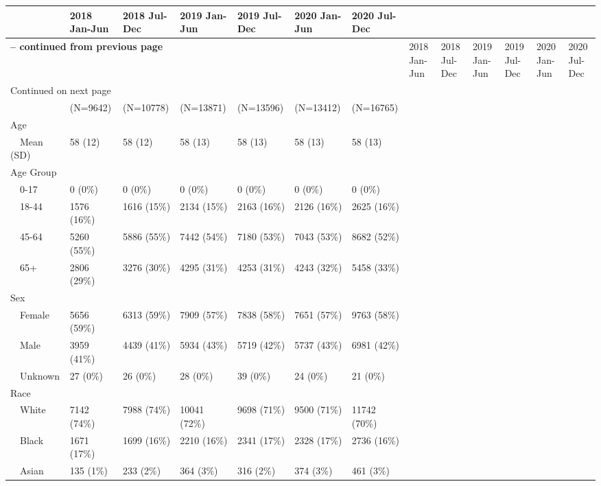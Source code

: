 \begin{longtable}{p{}p{}p{}p{}p{}p{}p{}}
   & 2018 Jan-Jun & 2018 Jul-Dec & 2019 Jan-Jun & 2019 Jul-Dec & 2020 Jan-Jun & 2020 Jul-Dec \\ 
  \hline 
\endfirsthead 
\multicolumn{7}{p{\textwidth}}{{ \bfseries \tablename \thetable{} -- continued from previous page}} \ 
\hline Feature & 2018 Jan-Jun & 2018 Jul-Dec & 2019 Jan-Jun & 2019 Jul-Dec & 2020 Jan-Jun & 2020 Jul-Dec \\ \hline 
\endhead 
\hline \multicolumn{7}{p{\textwidth}}{{Continued on next page}} \\ \hline 
\endfoot 
\hline 
\endlastfoot 
 \hline
 & (N=9642) & (N=10778) & (N=13871) & (N=13596) & (N=13412) & (N=16765) \\ 
  Age &  &  &  &  &  &  \\ 
    Mean (SD) & 58 (12) & 58 (12) & 58 (13) & 58 (13) & 58 (13) & 58 (13) \\ 
  Age Group &  &  &  &  &  &  \\ 
    0-17 & 0 (0\%) & 0 (0\%) & 0 (0\%) & 0 (0\%) & 0 (0\%) & 0 (0\%) \\ 
    18-44 & 1576 (16\%) & 1616 (15\%) & 2134 (15\%) & 2163 (16\%) & 2126 (16\%) & 2625 (16\%) \\ 
    45-64 & 5260 (55\%) & 5886 (55\%) & 7442 (54\%) & 7180 (53\%) & 7043 (53\%) & 8682 (52\%) \\ 
    65+ & 2806 (29\%) & 3276 (30\%) & 4295 (31\%) & 4253 (31\%) & 4243 (32\%) & 5458 (33\%) \\ 
  Sex &  &  &  &  &  &  \\ 
    Female & 5656 (59\%) & 6313 (59\%) & 7909 (57\%) & 7838 (58\%) & 7651 (57\%) & 9763 (58\%) \\ 
    Male & 3959 (41\%) & 4439 (41\%) & 5934 (43\%) & 5719 (42\%) & 5737 (43\%) & 6981 (42\%) \\ 
    Unknown & 27 (0\%) & 26 (0\%) & 28 (0\%) & 39 (0\%) & 24 (0\%) & 21 (0\%) \\ 
  Race &  &  &  &  &  &  \\ 
    White & 7142 (74\%) & 7988 (74\%) & 10041 (72\%) & 9698 (71\%) & 9500 (71\%) & 11742 (70\%) \\ 
    Black & 1671 (17\%) & 1699 (16\%) & 2210 (16\%) & 2341 (17\%) & 2328 (17\%) & 2736 (16\%) \\ 
    Asian & 135 (1\%) & 233 (2\%) & 364 (3\%) & 316 (2\%) & 374 (3\%) & 461 (3\%) \\ 

\end{longtable}
